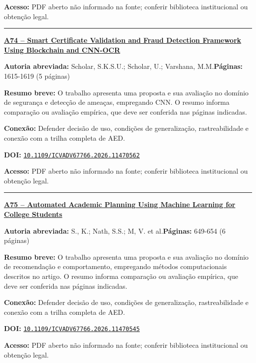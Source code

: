 \documentclass[10pt,a4paper]{article}
\begin{document}
\textbf{Acesso:} PDF aberto não informado na fonte; conferir biblioteca institucional ou obtenção legal.\par
\noindent\rule{\textwidth}{0.35pt}
\par\medskip\noindent
{\large\bfseries\href{https://doi.org/10.1109/ICVADV67766.2026.11470562}{A74 -- Smart Certificate Validation and Fraud Detection Framework Using Blockchain and CNN-OCR}}\par\smallskip
\textbf{Autoria abreviada:} Scholar, S.K.S.U.; Scholar, U.; Varshana, M.M.\quad \textbf{Páginas:} 1615-1619 (5 páginas)\par
\textbf{Resumo breve:} O trabalho apresenta uma proposta e sua avaliação no domínio de segurança e detecção de ameaças, empregando CNN. O resumo informa comparação ou avaliação empírica, que deve ser conferida nas páginas indicadas.\par
\textbf{Conexão:} Defender decisão de uso, condições de generalização, rastreabilidade e conexão com a trilha completa de AED.\par
\textbf{DOI:} \href{https://doi.org/10.1109/ICVADV67766.2026.11470562}{\nolinkurl{10.1109/ICVADV67766.2026.11470562}}\par
\textbf{Acesso:} PDF aberto não informado na fonte; conferir biblioteca institucional ou obtenção legal.\par
\noindent\rule{\textwidth}{0.35pt}
\par\medskip\noindent
{\large\bfseries\href{https://doi.org/10.1109/ICVADV67766.2026.11470545}{A75 -- Automated Academic Planning Using Machine Learning for College Students}}\par\smallskip
\textbf{Autoria abreviada:} S., K.; Nath, S.S.; M, V. et al.\quad \textbf{Páginas:} 649-654 (6 páginas)\par
\textbf{Resumo breve:} O trabalho apresenta uma proposta e sua avaliação no domínio de recomendação e comportamento, empregando métodos computacionais descritos no artigo. O resumo informa comparação ou avaliação empírica, que deve ser conferida nas páginas indicadas.\par
\textbf{Conexão:} Defender decisão de uso, condições de generalização, rastreabilidade e conexão com a trilha completa de AED.\par
\textbf{DOI:} \href{https://doi.org/10.1109/ICVADV67766.2026.11470545}{\nolinkurl{10.1109/ICVADV67766.2026.11470545}}\par
\textbf{Acesso:} PDF aberto não informado na fonte; conferir biblioteca institucional ou obtenção legal.\par
\end{document}
